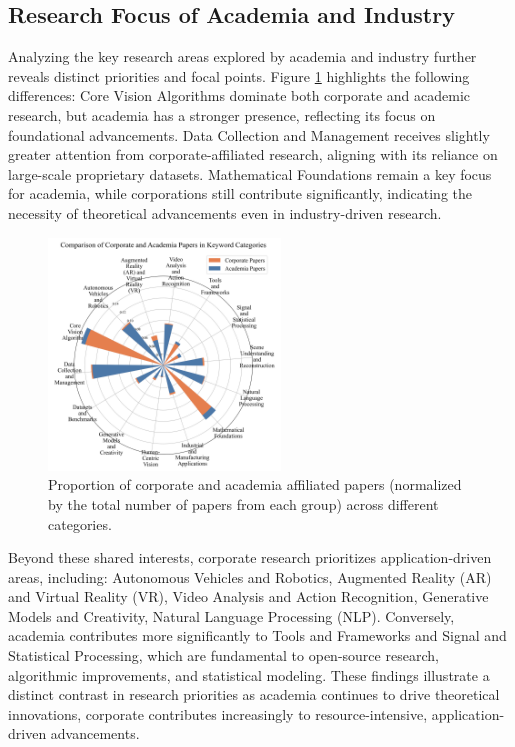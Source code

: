 \documentclass{article}
\begin{document}
\subsection{Research Focus of Academia and Industry}
\vspace{-10pt}
Analyzing the key research areas explored by academia and industry further reveals distinct priorities and focal points. Figure \ref{fig:research_focus_radar} highlights the following differences: Core Vision Algorithms dominate both corporate and academic research, but academia has a stronger presence, reflecting its focus on foundational advancements. Data Collection and Management receives slightly greater attention from corporate-affiliated research, aligning with its reliance on large-scale proprietary datasets. Mathematical Foundations remain a key focus for academia, while corporations still contribute significantly, indicating the necessity of theoretical advancements even in industry-driven research.
\begin{figure}
\centering
\includegraphics[width=0.55\textwidth]{report/images/radar_bar_plot_final.png}  
\caption{Proportion of corporate and academia affiliated papers (normalized by the total number of papers from each group) across different categories.}
\label{fig:research_focus_radar}
\end{figure}
Beyond these shared interests, corporate research prioritizes application-driven areas, including: Autonomous Vehicles and Robotics, Augmented Reality (AR) and Virtual Reality (VR), Video Analysis and Action Recognition, Generative Models and Creativity, Natural Language Processing (NLP). Conversely, academia contributes more significantly to Tools and Frameworks and Signal and Statistical Processing, which are fundamental to open-source research, algorithmic improvements, and statistical modeling. These findings illustrate a distinct contrast in research priorities as academia continues to drive theoretical innovations, corporate contributes increasingly to resource-intensive, application-driven advancements.
\end{document}
